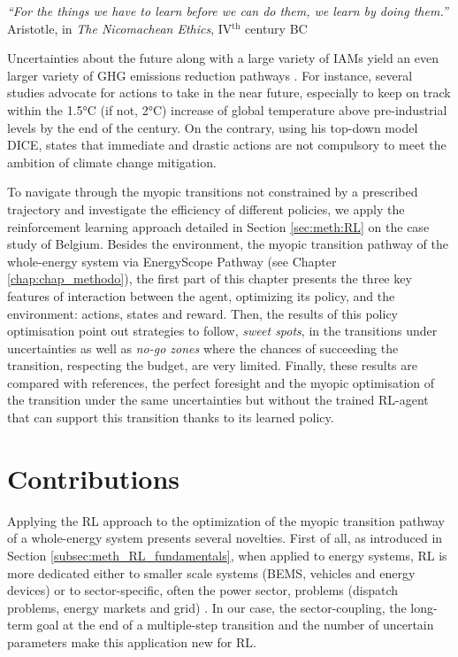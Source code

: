 \vspace{-0.2cm}
\begin{flushright}
\emph{``For the things we have to learn before we can do them, we learn by doing them.''}\\
Aristotle, in \textit{The Nicomachean Ethics}, IV$^\text{th}$ century BC
\end{flushright}
\vspace{0.4cm}

Uncertainties about the future along with a large variety of \gls{IAMs} yield an even larger variety of \gls{GHG} emissions reduction pathways \cite{nicolas2021robust}. For instance, several studies \cite{IPCC_CO2_budget,steffen2018trajectories} advocate for actions to take in the near future, especially to keep on track within the 1.5°C (if not, 2°C) increase of global temperature above pre-industrial levels by the end of the century. On the contrary, using his top-down model DICE, \citet{nordhaus2014question} states that immediate and drastic actions are not compulsory to meet the ambition of climate change mitigation. 

To navigate through the myopic transitions not constrained by a prescribed  trajectory and investigate the efficiency of different policies, we apply the reinforcement learning approach detailed in Section \ref{sec:meth:RL} on the case study of Belgium. Besides the environment, \ie the myopic transition pathway of the whole-energy system via EnergyScope Pathway (see Chapter \ref{chap:chap_methodo}), the first part of this chapter presents the three key features of interaction between the agent, optimizing its policy, and the environment: actions, states and reward.  Then, the results of this policy optimisation point out strategies to follow, \ie \textit{sweet spots}, in the transitions under uncertainties as well as \textit{no-go zones} where the chances of succeeding the transition, \ie respecting the  budget, are very limited. Finally, these results are compared with references, \ie the perfect foresight and the myopic optimisation of the transition under the same uncertainties but without the trained \gls{RL}-agent that can support this transition thanks to its learned policy.

\section*{Contributions}
\label{sec:RL:contributions}
Applying the \gls{RL} approach to the optimization of the myopic transition pathway of a whole-energy system presents several novelties. First of all, as introduced in Section \ref{subsec:meth_RL_fundamentals}, when applied to energy systems, \gls{RL} is more dedicated either to smaller scale systems (\eg \gls{BEMS}, vehicles and energy devices) or to sector-specific, often the power sector, problems (\eg dispatch problems, energy markets and grid) \cite{perera2021applications}. In our case, the sector-coupling, the long-term goal at the end of a multiple-step transition and the number of uncertain parameters make this application new for \gls{RL}.

